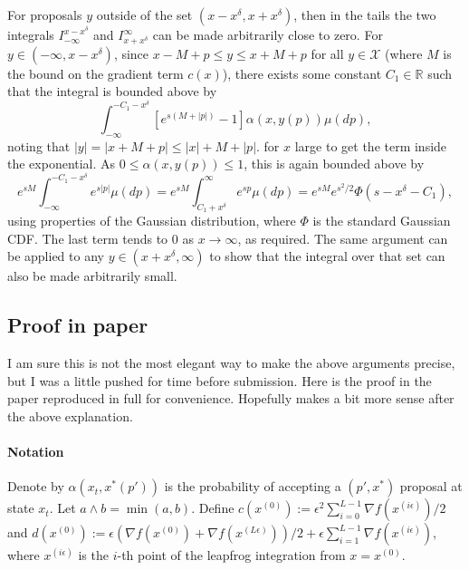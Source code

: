 \documentclass{article}
\newcommand{\X}{\mathcal{X}}
\begin{document}
For proposals $y$ outside of the set $(x - x^\delta,x + x^\delta)$, then in the tails the two integrals $I_{-\infty}^{x - x^\delta}$ and $I_{x + x^\delta}^\infty$ can be made arbitrarily close to zero.  For $y \in (-\infty,x-x^{\delta})$, since $x - M + p \leq y \leq x + M + p$ for all $y \in \X$ (where $M$ is the bound on the gradient term $c(x)$), there exists some constant $C_1 \in \mathbb{R}$ such that the integral is bounded above by
\[
\int_{-\infty}^{- C_1 - x^\delta} \left[e^{s(M + |p|)} - 1 \right]\alpha(x,y(p))\mu(dp),
\]
noting that $|y| = |x + M + p| \leq |x| + M + |p|$.  for $x$ large to get the term inside the exponential. As $0 \leq \alpha(x,y(p)) \leq 1$, this is again bounded above by
\[
e^{sM}\int_{-\infty}^{- C_1 - x^\delta} e^{s|p|}\mu(dp) = e^{sM}\int_{C_1 + x^{\delta}}^{\infty} e^{sp}\mu(dp) = e^{sM}e^{s^2/2}\Phi(s - x^\delta - C_1),
\]
using properties of the Gaussian distribution, where $\Phi$ is the standard Gaussian CDF.  The last term tends to $0$ as $x \to \infty$, as required.  The same argument can be applied to any $y \in (x + x^\delta,\infty)$ to show that the integral over that set can also be made arbitrarily small.

\subsection{Proof in paper}

I am sure this is not the most elegant way to make the above arguments precise, but I was a little pushed for time before submission.  Here is the proof in the paper reproduced in full for convenience.  Hopefully makes a bit more sense after the above explanation.

\paragraph{Notation}

Denote by $\alpha(x_{t},x^{*}(p'))$ is the probability of accepting
a $(p',x^{*})$ proposal at state $x_{t}$. Let $a\wedge b=\min(a,b)$.
Define $c(x^{(0)}):=\epsilon^{2}\sum_{i=0}^{L-1}\nabla f(x^{(i\epsilon)})/2$
and $d(x^{(0)}):=\epsilon(\nabla f(x^{(0)})+\nabla f(x^{(L\epsilon)}))/2+\epsilon\sum_{i=1}^{L-1}\nabla f(x^{(i\epsilon)})$,
where $x^{(i\epsilon)}$ is the $i$-th point of the leapfrog integration
from $x=x^{(0)}$.
\end{document}
